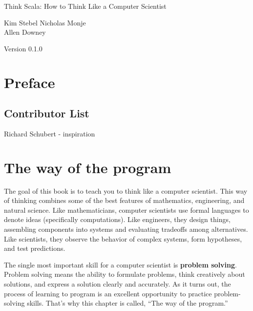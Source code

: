 \documentclass[10pt]{book}
\newcommand{\thetitle}{Think Scala: How to Think Like a Computer Scientist}
\newcommand{\theversion}{0.1.0}
\begin{document}

\begin{htmlonly}


{\Large \thetitle}

{\large Kim Stebel}
{\large Nicholas Monje\\}
{\large Allen Downey\\}

Version \theversion

\setcounter{chapter}{-1}

\end{htmlonly}

\chapter{Preface}


\section*{Contributor List}
{\large Richard Schubert - inspiration}


\begin{latexonly}

\tableofcontents

\clearemptydoublepage

\end{latexonly}

\mainmatter


\chapter{The way of the program}

The goal of this book is to teach you to think like a
computer scientist.  This way of thinking combines some of the best features
of mathematics, engineering, and natural science.  Like mathematicians,
computer scientists use formal languages to denote ideas (specifically
computations).  Like engineers, they design things, assembling components
into systems and evaluating tradeoffs among alternatives.  Like scientists,
they observe the behavior of complex systems, form hypotheses, and test
predictions.


The single most important skill for a computer scientist is {\bf
problem solving}.  Problem solving means the ability to formulate
problems, think creatively about solutions, and express a solution clearly
and accurately.  As it turns out, the process of learning to program is an
excellent opportunity to practice problem-solving skills.  That's why
this chapter is called, ``The way of the program.''
\end{document}

